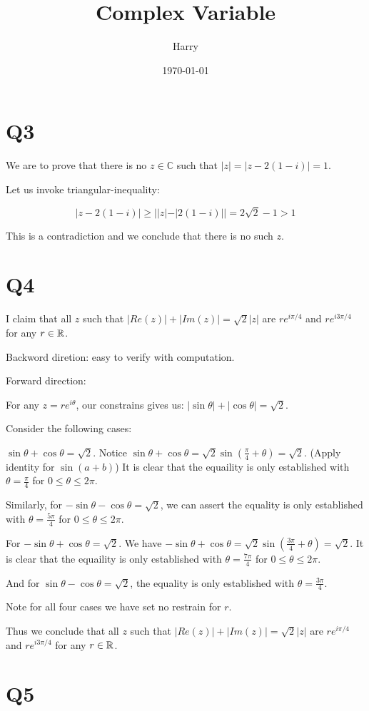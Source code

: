 \documentclass[12pt]{article}
\title{Complex Variable}
\author{Harry}
\date{\today}
\begin{document}
\section{Q3}
We are to prove that there is no $z \in \mathbb{C}$ such that $|z| = |z-2(1-i)| = 1$.

Let us invoke triangular-inequality:

$$
|z-2(1-i)| \geq	||z| - |2(1-i)|| = 2\sqrt{2} - 1 > 1
$$

This is a contradiction and we conclude that there is no such $z$.

\section{Q4}
I claim that all $z$ such that $|Re(z)| + |Im(z)| = \sqrt{2} |z|$ are $r e^{i \pi/4}$ and $r e^{i 3\pi/4}$ for any $r \in \mathbb{R}$.

Backword diretion: easy to verify with computation.

Forward direction:

For any $z = re^{i \theta}$, our constrains gives us: $|\sin{\theta}| + |\cos{\theta}| = \sqrt{2}$.

Consider the following cases:

$\sin{\theta} + \cos{\theta} = \sqrt{2}$. 
Notice $\sin{\theta} + \cos{\theta} = \sqrt{2}\sin{(\frac{\pi}{4} + \theta)} = \sqrt{2}$. (Apply identity for $\sin(a+b)$)
It is clear that the equaility is only established with $\theta = \frac{\pi}{4}$ for $0\leq \theta \leq 2\pi$.

Similarly, for 
$-\sin{\theta}  -\cos{\theta} = \sqrt{2}$, we can assert the equality is only established with $\theta = \frac{5\pi}{4}$ for $0\leq \theta \leq 2\pi$.


For $-\sin{\theta} + \cos{\theta} = \sqrt{2}$. We have
$-\sin{\theta} + \cos{\theta} = \sqrt{2}\sin{(\frac{3\pi}{4} + \theta)} = \sqrt{2}$. 
It is clear that the equaility is only established with $\theta = \frac{7\pi}{4}$ for $0\leq \theta \leq 2\pi$.

And for $\sin{\theta} - \cos{\theta} = \sqrt{2}$, the equality is only established with $\theta = \frac{3\pi}{4}$.

Note for all four cases we have set no restrain for $r$. 

Thus we conclude that all $z$ such that $|Re(z)| + |Im(z)| = \sqrt{2} |z|$ are $r e^{i \pi/4}$ and $r e^{i 3\pi/4}$ for any $r \in \mathbb{R}$.

\section{Q5}
\end{document}
